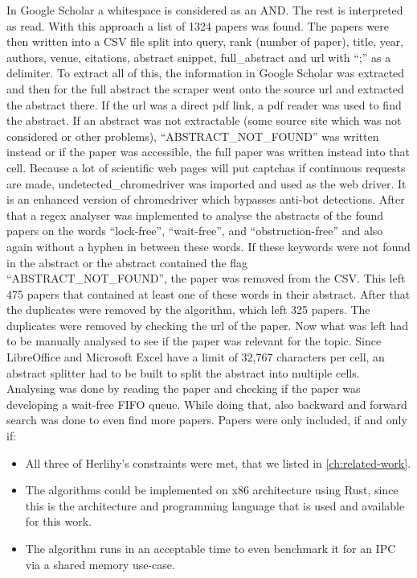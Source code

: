 In Google Scholar a whitespace is considered as an AND. The rest is interpreted as read. With this approach a list of 1324 papers was found. The papers were then written into a CSV file split into query, rank (number of paper), title, year, authors, venue, citations, abstract snippet, full\_abstract and url with \enquote{;} as a delimiter. To extract all of this, the information in Google Scholar was extracted and then for the full abstract the scraper went onto the source url and extracted the abstract there. If the url was a direct pdf link, a pdf reader was used to find the abstract. If an abstract was not extractable (some source site which was not considered or other problems), \enquote{ABSTRACT\_NOT\_FOUND} was written instead or if the paper was accessible, the full paper was written instead into that cell. Because a lot of scientific web pages will put captchas if continuous requests are made, undetected\_chromedriver was imported and used as the web driver. It is an enhanced version of chromedriver which bypasses anti-bot detections. After that a regex analyser was implemented to analyse the abstracts of the found papers on the words \enquote{lock-free}, \enquote{wait-free}, and \enquote{obstruction-free} and also again without a hyphen in between these words. If these keywords were not found in the abstract or the abstract contained the flag \enquote{ABSTRACT\_NOT\_FOUND}, the paper was removed from the CSV. This left 475 papers that contained at least one of these words in their abstract. After that the duplicates were removed by the algorithm, which left 325 papers. The duplicates were removed by checking the url of the paper. Now what was left had to be manually analysed to see if the paper was relevant for the topic. Since LibreOffice and Microsoft Excel have a limit of 32,767 characters per cell, an abstract splitter had to be built to split the abstract into multiple cells. Analysing was done by reading the paper and checking if the paper was developing a wait-free \ac{FIFO} queue. While doing that, also backward and forward search was done to even find more papers. Papers were only included, if and only if: 
\begin{itemize}
   \item All three of Herlihy's constraints were met, that we listed in \cref{ch:related-work}.
   \item The algorithms could be implemented on x86 architecture using Rust, since this is the architecture and programming language that is used and available for this work.
   \item The algorithm runs in an acceptable time to even benchmark it for an \ac{IPC} via a shared memory use-case.
\end{itemize}
